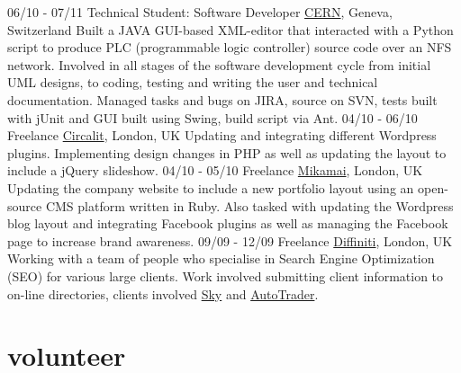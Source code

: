 \documentclass[]{friggeri-cv}
\begin{document}
\begin{entrylist}
  \entry
    {06/10 - 07/11}
    {Technical Student: Software Developer}
    {\href{http://cern.ch}{CERN}, Geneva, Switzerland}
    {Built a JAVA GUI-based XML-editor that interacted with a Python script to produce PLC (programmable logic controller) source code over an NFS network. Involved in all stages of the software development cycle from initial UML designs, to coding, testing and writing the user and technical documentation. Managed tasks and bugs on JIRA, source on SVN, tests built with jUnit and GUI built using Swing, build script via Ant.}
  \entry
    {04/10 - 06/10}
    {Freelance}
    {\href{http://www.circalit.com}{Circalit}, London, UK}
    {Updating and integrating different Wordpress plugins. Implementing design changes in PHP as well as updating the layout to include a jQuery slideshow.}
  \entry
    {04/10 - 05/10}
    {Freelance}
    {\href{http://mikamai.com}{Mikamai}, London, UK}
    {Updating the company website to include a new portfolio layout using an open-source CMS platform written in Ruby. Also tasked with updating the Wordpress blog layout and integrating Facebook plugins as well as managing the Facebook page to increase brand awareness.}
  \entry
    {09/09 - 12/09}
    {Freelance}
    {\href{http://www.diffiniti.com}{Diffiniti}, London, UK}
    {Working with a team of people who specialise in Search Engine Optimization (SEO) for various large clients. Work involved submitting client information to on-line directories, clients involved \href{http://www.sky.com}{Sky} and \href{http://www.autotrader.com}{AutoTrader}.}
\end{entrylist}

\section{volunteer}
\end{document}
